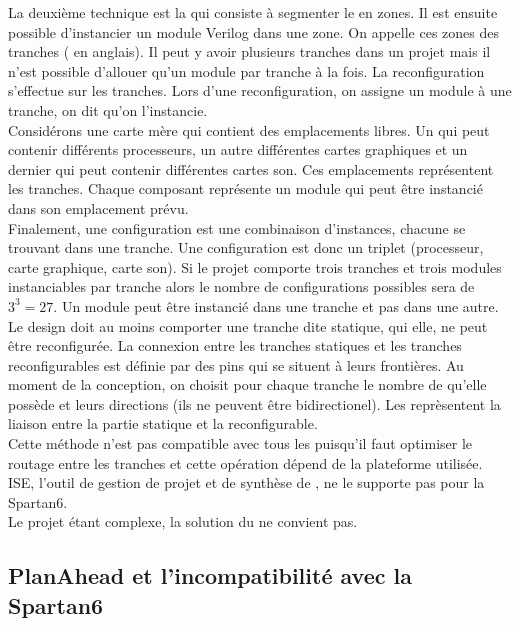 La deuxième technique est la  qui consiste à segmenter le \fpga{} en zones. Il est ensuite possible d'instancier un module Verilog dans une zone. On appelle ces zones des tranches ( en anglais). Il peut y avoir plusieurs tranches dans un projet mais il n'est possible d'allouer qu'un module par tranche à la fois. La reconfiguration s'effectue sur les tranches. Lors d'une reconfiguration, on assigne un module à une tranche, on dit qu'on l'instancie.\\
Considérons une carte mère qui contient des emplacements libres. Un qui peut contenir différents processeurs, un autre différentes cartes graphiques et un dernier qui peut contenir différentes cartes son. Ces emplacements représentent les tranches. Chaque composant représente un module qui peut être instancié dans son emplacement prévu.\\
Finalement, une configuration est une combinaison d'instances, chacune se trouvant dans une tranche. Une configuration est donc un triplet (processeur, carte graphique, carte son). Si le projet comporte trois tranches et trois modules instanciables par tranche alors le nombre de configurations possibles sera de $3^3=27$. Un module peut être instancié dans une tranche et pas dans une autre.\\
Le design doit au moins comporter une tranche dite statique, qui elle, ne peut être reconfigurée. La connexion entre les tranches statiques et les tranches reconfigurables est définie par des pins qui se situent à leurs frontières. Au moment de la conception, on choisit pour chaque tranche le nombre de  qu'elle possède et leurs directions (ils ne peuvent être bidirectionel). Les  reprèsentent la liaison entre la partie statique et la reconfigurable.\\

Cette méthode n'est pas compatible avec tous les \fpgas{} puisqu'il faut optimiser le routage entre les tranches et cette opération dépend de la plateforme utilisée. ISE, l'outil de gestion de projet et de synthèse de , ne le supporte pas pour la Spartan6.\\
Le projet étant complexe, la solution du  ne convient pas.

\subsection{PlanAhead et l'incompatibilité avec la Spartan6}

